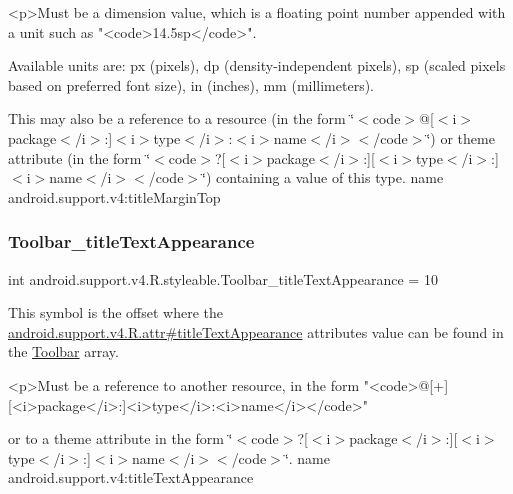 \begin{DoxyVerb}      <p>Must be a dimension value, which is a floating point number appended with a unit such as "<code>14.5sp</code>".
\end{DoxyVerb}
 Available units are\+: px (pixels), dp (density-\/independent pixels), sp (scaled pixels based on preferred font size), in (inches), mm (millimeters). 

This may also be a reference to a resource (in the form \char`\"{}$<$code$>$@\mbox{[}$<$i$>$package$<$/i$>$\+:\mbox{]}$<$i$>$type$<$/i$>$\+:$<$i$>$name$<$/i$>$$<$/code$>$\char`\"{}) or theme attribute (in the form \char`\"{}$<$code$>$?\mbox{[}$<$i$>$package$<$/i$>$\+:\mbox{]}\mbox{[}$<$i$>$type$<$/i$>$\+:\mbox{]}$<$i$>$name$<$/i$>$$<$/code$>$\char`\"{}) containing a value of this type.  name android.\+support.\+v4\+:title\+Margin\+Top \mbox{\label{classandroid_1_1support_1_1v4_1_1R_1_1styleable_a87e1a78ebc943729c097ee28bda542cd}} 
\subsubsection{\texorpdfstring{Toolbar\+\_\+title\+Text\+Appearance}{Toolbar\_titleTextAppearance}}
{\footnotesize\ttfamily int android.\+support.\+v4.\+R.\+styleable.\+Toolbar\+\_\+title\+Text\+Appearance = 10\hspace{0.3cm}{\ttfamily [static]}}

This symbol is the offset where the \hyperlink{classandroid_1_1support_1_1v4_1_1R_1_1attr_abcf9d1c52112fe1f7d6defda965edf39}{android.\+support.\+v4.\+R.\+attr\#title\+Text\+Appearance} attribute\textquotesingle{}s value can be found in the \hyperlink{classandroid_1_1support_1_1v4_1_1R_1_1styleable_a211358a2f951023c7735caea0fb5ae04}{Toolbar} array.

\begin{DoxyVerb}      <p>Must be a reference to another resource, in the form "<code>@[+][<i>package</i>:]<i>type</i>:<i>name</i></code>"
\end{DoxyVerb}
 or to a theme attribute in the form \char`\"{}$<$code$>$?\mbox{[}$<$i$>$package$<$/i$>$\+:\mbox{]}\mbox{[}$<$i$>$type$<$/i$>$\+:\mbox{]}$<$i$>$name$<$/i$>$$<$/code$>$\char`\"{}.  name android.\+support.\+v4\+:title\+Text\+Appearance \mbox{\label{classandroid_1_1support_1_1v4_1_1R_1_1styleable_a249158d0b5533c28e927718a4311d4fb}} 
